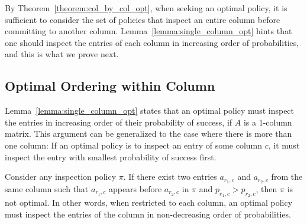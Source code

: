  By Theorem~\ref{theorem:col_by_col_opt}, when seeking an optimal policy, it is sufficient to consider the set of policies that inspect an entire column before committing to another column. Lemma~\ref{lemma:single_column_opt} hints that one should inspect the entries of each column in increasing order of probabilities, and this is what we prove next.


 \subsection{Optimal Ordering within Column} 

 Lemma~\ref{lemma:single_column_opt} states that
 an optimal policy must inspect the entries in increasing order of their probability of success, if $A$ is a 1-column matrix.
 This argument can be generalized to the case where there is more than one column: If an optimal policy is to inspect an entry of some column $c$, it must inspect the entry with smallest probability of success first. 
 \begin{theorem} \label{theorem:within_column_opt}
 	Consider any inspection policy $\pi$.
 	If there exist two entries $a_{r_1,c}$ and $a_{r_2,c}$ from the same column such that $a_{r_1,c}$ appears before $a_{r_2,c}$ in $\pi$ and $p_{r_1,c} > p_{r_2,c}$, then $\pi$ is not optimal. 
 	In other words, when restricted to each column, an optimal policy must inspect the entries of the column in non-decreasing order of probabilities.
 \end{theorem}
